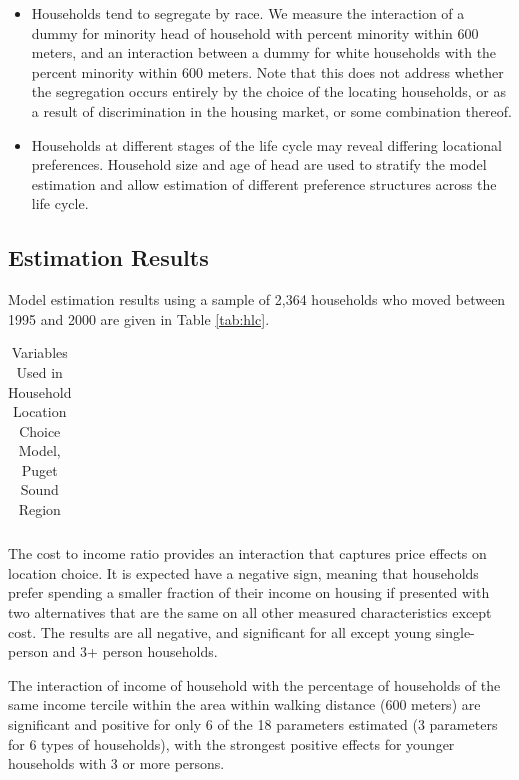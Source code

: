 \documentclass[12pt,a4paper]{article}
\begin{document}
\begin{itemize}
\item Households tend to segregate by race.  We measure the
interaction of a dummy for minority head of household with percent
minority within 600 meters, and an interaction between a dummy for
white households with the percent minority within 600 meters.  Note
that this does not address whether the segregation occurs entirely by
the choice of the locating households, or as a result of discrimination
in the housing market, or some combination thereof.

\item Households at different stages of the life cycle may reveal
differing locational preferences. Household size and age of head
are used to stratify the model estimation and allow estimation of
different preference structures across the life cycle.

\end{itemize}


\subsection{Estimation Results}
Model estimation results using a sample of 2,364 households who
moved between 1995 and 2000 are given in Table \ref{tab:hlc}.

\begin{table}[h]
\caption{Variables Used in Household Location Choice Model, Puget
Sound Region} \label{tab:vardef} \centering
\begin{tabular}{ll}
\hline\hline

\hline
\end{tabular}
\end{table}

The cost to income ratio provides an interaction that captures
price effects on location choice.  It is expected have a negative
sign, meaning that households prefer spending a smaller fraction
of their income on housing if presented with two alternatives that
are the same on all other measured characteristics except cost.
The results are all negative, and significant for all except young
single-person and 3+ person households.

The interaction of income of household with the percentage of
households of the same income tercile within the area within
walking distance (600 meters) are significant and positive for
only 6 of the 18 parameters estimated (3 parameters for 6 types of
households), with the strongest positive effects for younger
households with 3 or more persons.
\end{document}
